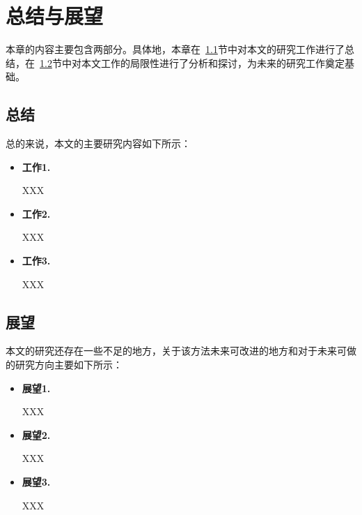 \newpage
\setcounter{table}{0}
\setcounter{figure}{0}
\section{总结与展望}

本章的内容主要包含两部分。具体地，本章在~\ref{summarize}节中对本文的研究工作进行了总结，在~\ref{future}节中对本文工作的局限性进行了分析和探讨，为未来的研究工作奠定基础。


\subsection{总结}\label{summarize}





总的来说，本文的主要研究内容如下所示：
\begin{itemize}
	\item[(1)]  \textbf{工作1.}
	
    XXX
	
	
	\item[(2)] \textbf{工作2.}
	
    XXX
	
	\item[(3)] \textbf{工作3.}

    XXX
	
	
\end{itemize}


\subsection{展望}\label{future}
本文的研究还存在一些不足的地方，关于该方法未来可改进的地方和对于未来可做的研究方向主要如下所示：

\begin{itemize}
	\item[(1)]  \textbf{展望1.}
	
    XXX
	
	
	\item[(2)] \textbf{展望2.}
	
    XXX
	
	
	\item[(3)] \textbf{展望3.}
	
    XXX
	
	
	
\end{itemize}


